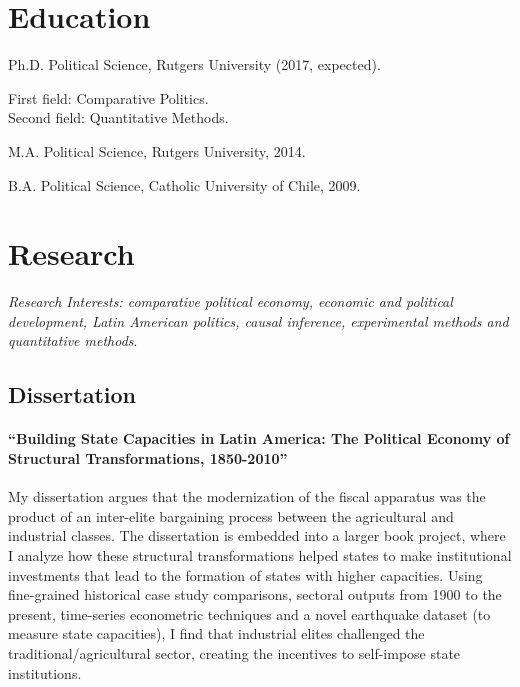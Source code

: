 \documentclass[letterpaper]{article}
\renewenvironment{itemize}{
  \begin{list}{}{
    \setlength{\leftmargin}{1.5em}
  }
}{
  \end{list}
}
\begin{document}
\section*{Education}

\begin{itemize}
  \item Ph.D. Political Science, Rutgers University (2017, expected).
  	\begin{itemize}
  		\item First field: {\small Comparative Politics}. \\ Second field: {\small Quantitative Methods}.
	\end{itemize}

  \item M.A. Political Science, Rutgers University, 2014.

  \item B.A. Political Science, Catholic University of Chile, 2009.
\end{itemize}


%


\section*{Research}

\emph{Research Interests: comparative political economy, economic and political development, Latin American politics, causal inference, experimental methods and quantitative methods}.

\subsection*{Dissertation}

\paragraph{``Building State Capacities in Latin America: The Political Economy of Structural Transformations, 1850-2010''} My dissertation argues that the modernization of the fiscal apparatus was the product of an inter-elite bargaining process between the agricultural and industrial classes. The dissertation is embedded into a larger book project, where I analyze how these structural transformations helped states to make institutional investments that lead to the formation of states with higher capacities. Using fine-grained historical case study comparisons, sectoral outputs from 1900 to the present, time-series econometric techniques and a novel earthquake dataset (to measure state capacities), I find that industrial elites challenged the traditional/agricultural sector, creating the incentives to self-impose state institutions.
\end{document}
